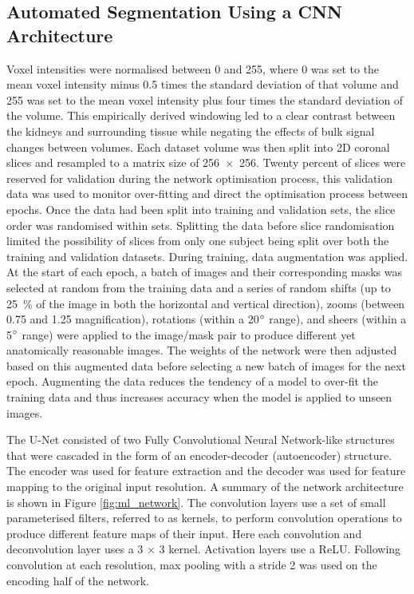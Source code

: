 \subsection{Automated Segmentation Using a CNN Architecture}

Voxel intensities were normalised between 0 and 255, where 0 was set to the mean voxel intensity minus 0.5 times the standard deviation of that volume and 255 was set to the mean voxel intensity plus four times the standard deviation of the volume. This empirically derived windowing led to a clear contrast between the kidneys and surrounding tissue while negating the effects of bulk signal changes between volumes. Each dataset volume was then split into 2D coronal slices and resampled to a matrix size of 256~$\times$~256. Twenty percent of slices were reserved for validation during the network optimisation process, this validation data was used to monitor over-fitting and direct the optimisation process between epochs. Once the data had been split into training and validation sets, the slice order was randomised within sets. Splitting the data before slice randomisation limited the possibility of slices from only one subject being split over both the training and validation datasets. During training, data augmentation was applied. At the start of each epoch, a batch of images and their corresponding masks was selected at random from the training data and a series of random shifts (up to 25~\% of the image in both the horizontal and vertical direction), zooms (between 0.75 and 1.25 magnification), rotations (within a 20$\degree$ range), and sheers (within a 5$\degree$ range) were applied to the image/mask pair to produce different yet anatomically reasonable images. The weights of the network were then adjusted based on this augmented data before selecting a new batch of images for the next epoch. Augmenting the data reduces the tendency of a model to over-fit the training data and thus increases accuracy when the model is applied to unseen images. 

The U-Net consisted of two Fully Convolutional Neural Network-like structures that were cascaded in the form of an encoder-decoder (autoencoder) structure. The encoder was used for feature extraction and the decoder was used for feature mapping to the original input resolution. A summary of the network architecture is shown in Figure \ref{fig:ml_network}. The convolution layers use a set of small parameterised filters, referred to as kernels, to perform convolution operations to produce different feature maps of their input. Here each convolution and deconvolution layer uses a 3 $\times$ 3 kernel. Activation layers use a \ac{ReLU}. Following convolution at each resolution, max pooling with a stride 2 was used on the encoding half of the network.

